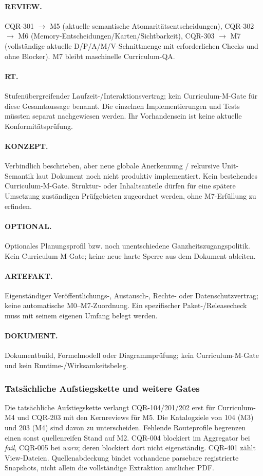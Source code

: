 \paragraph{REVIEW.} CQR-301 \ensuremath{\to} M5 (aktuelle semantische Atomaritätsentscheidungen), CQR-302 \ensuremath{\to} M6 (Memory-Entscheidungen/Karten/Sichtbarkeit), CQR-303 \ensuremath{\to} M7 (vollständige aktuelle D/P/A/M/V-Schnittmenge mit erforderlichen Checks und ohne Blocker). M7 bleibt maschinelle Curriculum-QA.
\paragraph{RT.} Stufenübergreifender Laufzeit-/Interaktionsvertrag; kein Curriculum-M-Gate für diese Gesamtaussage benannt. Die einzelnen Implementierungen und Tests müssten separat nachgewiesen werden. Ihr Vorhandensein ist keine aktuelle Konformitätsprüfung.
\paragraph{KONZEPT.} Verbindlich beschrieben, aber neue globale Anerkennung / rekursive Unit-Semantik laut Dokument noch nicht produktiv implementiert. Kein bestehendes Curriculum-M-Gate. Struktur- oder Inhaltsanteile dürfen für eine spätere Umsetzung zuständigen Prüfgebieten zugeordnet werden, ohne M7-Erfüllung zu erfinden.
\paragraph{OPTIONAL.} Optionales Planungsprofil bzw. noch unentschiedene Ganzheitszugangspolitik. Kein Curriculum-M-Gate; keine neue harte Sperre aus dem Dokument ableiten.
\paragraph{ARTEFAKT.} Eigenständiger Veröffentlichungs-, Austausch-, Rechte- oder Datenschutzvertrag; keine automatische M0–M7-Zuordnung. Ein spezifischer Paket-/Releasecheck muss mit seinem eigenen Umfang belegt werden.
\paragraph{DOKUMENT.} Dokumentbuild, Formelmodell oder Diagrammprüfung; kein Curriculum-M-Gate und kein Runtime-/Wirksamkeitsbeleg.

\subsubsection*{Tatsächliche Aufstiegskette und weitere Gates}
Die tatsächliche Aufstiegskette verlangt CQR-104/201/202 erst für Curriculum-M4 und CQR-203 mit den Kernreviews für M5. Die Katalogziele von 104 (M3) und 203 (M4) sind davon zu unterscheiden. Fehlende Routeprofile begrenzen einen sonst quellenreifen Stand auf M2. CQR-004 blockiert im Aggregator bei \emph{fail}, CQR-005 bei \emph{warn}; deren  blockiert dort nicht eigenständig. CQR-401 zählt View-Dateien. Quellenabdeckung bindet vorhandene parsebare registrierte Snapshots, nicht allein die vollständige Extraktion amtlicher PDF.

